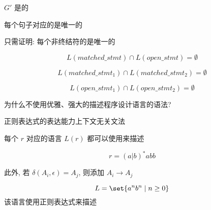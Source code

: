 \begin{frame}{}
  \begin{center}
    $G'$ 是的

    \pause
    \vspace{0.20cm}
    每个句子对应的是唯一的

    \pause
    \vspace{0.30cm}
    只需证明: 每个非终结符的是唯一的

    \pause
    \[
      L(matched\_stmt) \cap L(open\_stmt) = \emptyset
    \]

    \pause
    \vspace{-0.50cm}
    \[
      L(matched\_stmt_{1}) \cap L(matched\_stmt_{2}) = \emptyset
    \]

    \pause
    \vspace{-0.50cm}
    \[
      L(open\_stmt_{1}) \cap L(open\_stmt_{2}) = \emptyset
    \]
  \end{center}
\end{frame}

\begin{frame}{}
  \begin{center}
    为什么不使用优雅、强大的描述程序设计语言的语法?

    \vspace{0.50cm}
    正则表达式的表达能力上下文无关文法
  \end{center}
\end{frame}

\begin{frame}{}
  \begin{center}
    每个 $r$ 对应的语言 $L(r)$ 都可以使用来描述

    \[
      r = (a | b)^{\ast} abb
    \]

    \pause

    \pause
    此外, 若 $\delta(A_i, \epsilon) = A_{j}$, 则添加 $A_{i} \to A_{j}$
  \end{center}
\end{frame}

\begin{frame}{}
  \begin{center}
    

    \[
      L = \set{a^{n} b^{n} \mid n \ge 0}
    \]
    该语言使用正则表达式来描述
  \end{center}
\end{frame}

